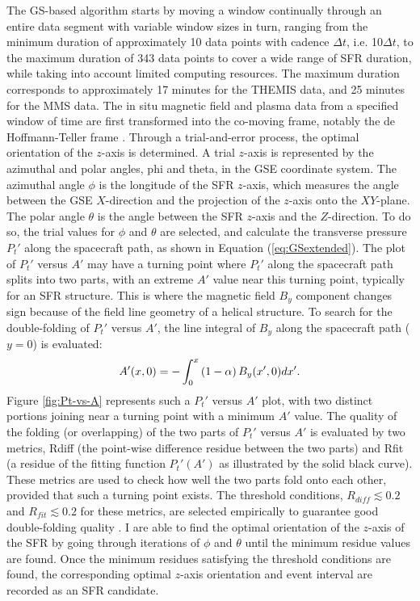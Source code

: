 The GS-based algorithm starts by moving a window continually through an entire data segment with variable window sizes in turn, ranging from the minimum duration of approximately 10 data points with cadence $\Delta t$, i.e. 10$\Delta t$, to the maximum duration of 343 data points to cover a wide range of SFR duration, while taking into account limited computing resources. The maximum duration corresponds to approximately 17 minutes for the THEMIS data, and 25 minutes for the MMS data. The in situ magnetic field and plasma data from a specified window of time are first transformed into the co-moving frame, notably the de Hoffmann-Teller frame \citep{deHoffman-Teller:1950}. Through a trial-and-error process, the optimal orientation of the $z$-axis is determined. A trial $z$-axis is represented by the azimuthal and polar angles, \gls{phi} and \gls{theta}, in the GSE coordinate system. The azimuthal angle $\phi$ is the longitude of the SFR $z$-axis, which measures the angle between the GSE $X$-direction and the projection of the $z$-axis onto the $XY$-plane. The polar angle $\theta$ is the angle between the SFR $z$-axis and the $Z$-direction. To do so, the trial values for $\phi$ and $\theta$ are selected, and calculate the transverse pressure $P_t'$ along the spacecraft path, as shown in Equation (\ref{eq:GSextended}). The plot of $P_t'$ versus $A'$ may have a turning point where $P_t'$ along the spacecraft path splits into two parts, with an extreme $A'$ value near this turning point, typically for an SFR structure. This is where the magnetic field $B_y$ component changes sign because of the field line geometry of a helical structure. To search for the double-folding of $P_t'$ versus $A'$, the line integral of $B_y$ along the spacecraft path ($y=0$) is evaluated:
\begin{equation}
    A'(x,0)=-\int_0^x\left( 1-\alpha \right)B_y(x',0)dx'.
    \label{eq:By-integral}
\end{equation}
Figure \ref{fig:Pt-vs-A} represents such a $P_t'$ versus $A'$ plot, with two distinct portions joining near a turning point with a minimum $A'$ value. The quality of the folding (or overlapping) of the two parts of $P_t'$ versus $A'$ is evaluated by two metrics, \gls{Rdiff} (the point-wise difference residue between the two parts) and \gls{Rfit} (a residue of the fitting function $P_t'(A')$ as illustrated by the solid black curve). These metrics are used to check how well the two parts fold onto each other, provided that such a turning point exists. The threshold conditions, $R_{diff}\lesssim 0.2$ and $R_{fit}\lesssim 0.2$ for these metrics, are selected empirically to guarantee good double-folding quality \citep{Hu:2018}. I are able to find the optimal orientation of the $z$-axis of the SFR by going through iterations of $\phi$ and $\theta$ until the minimum residue values are found. Once the minimum residues satisfying the threshold conditions are found, the corresponding optimal $z$-axis orientation and event interval are recorded as an SFR candidate.

